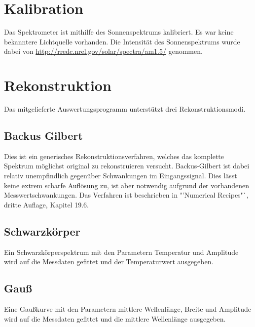 \documentclass[a4paper, 12pt]{scrartcl}
\begin{document}
\section{Kalibration}
Das Spektrometer ist mithilfe des Sonnenspektrums kalibriert. Es war keine bekanntere Lichtquelle vorhanden. Die Intensität des Sonnenspektrums wurde dabei von \url{http://rredc.nrel.gov/solar/spectra/am1.5/} genommen.


\section{Rekonstruktion}
Das mitgelieferte Auswertungsprogramm unterstützt drei Rekonstruktionsmodi.

\subsection{Backus Gilbert}
Dies ist ein generisches Rekonstruktionsverfahren, welches das komplette Spektrum möglichst original zu rekonstruieren versucht.
Backus-Gilbert ist dabei relativ unempfindlich gegenüber Schwankungen im Eingangssignal.
Dies lässt keine extrem scharfe Auflösung zu, ist aber notwendig aufgrund der vorhandenen Messwertschwankungen.
Das Verfahren ist beschrieben in "'Numerical Recipes"`, dritte Auflage, Kapitel 19.6.

\subsection{Schwarzkörper}
Ein Schwarzkörperspektrum mit den Parametern Temperatur und Amplitude wird auf die Messdaten gefittet und der Temperaturwert ausgegeben.

\subsection{Gauß}
Eine Gaußkurve mit den Parametern mittlere Wellenlänge, Breite und Amplitude wird auf die Messdaten gefittet und die mittlere Wellenlänge ausgegeben.
\end{document}
